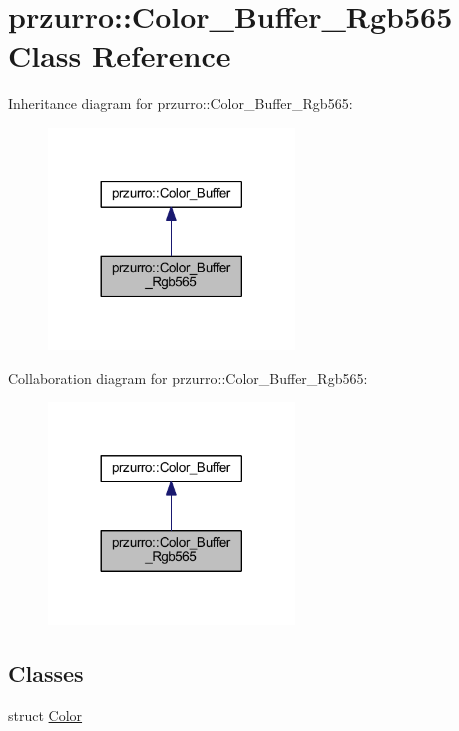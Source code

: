 \hypertarget{classprzurro_1_1_color___buffer___rgb565}{}\section{przurro\+::Color\+\_\+\+Buffer\+\_\+\+Rgb565 Class Reference}
\label{classprzurro_1_1_color___buffer___rgb565}


Inheritance diagram for przurro\+::Color\+\_\+\+Buffer\+\_\+\+Rgb565\+:
\nopagebreak
\begin{figure}[H]
\begin{center}
\leavevmode
\includegraphics[width=185pt]{d7/d3a/classprzurro_1_1_color___buffer___rgb565__inherit__graph}
\end{center}
\end{figure}


Collaboration diagram for przurro\+::Color\+\_\+\+Buffer\+\_\+\+Rgb565\+:
\nopagebreak
\begin{figure}[H]
\begin{center}
\leavevmode
\includegraphics[width=185pt]{df/ddd/classprzurro_1_1_color___buffer___rgb565__coll__graph}
\end{center}
\end{figure}
\subsection*{Classes}
\begin{DoxyCompactItemize}
\item 
struct \mbox{\hyperlink{structprzurro_1_1_color___buffer___rgb565_1_1_color}{Color}}
\end{DoxyCompactItemize}
